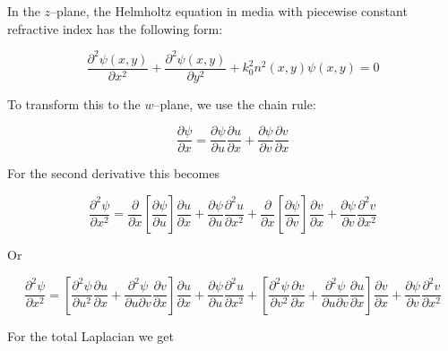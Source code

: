 \begin{sidebar}
In the $z$--plane, the Helmholtz equation in media with piecewise constant
refractive index has the following form:

\begin{equation}
\frac{\partial^2 \psi(x,y)}{\partial x^2} + \frac{\partial^2 \psi(x,y)}{\partial
y^2} + k_0^2 n^2(x,y) \psi(x,y) = 0
\end{equation} 

To transform this to the $w$--plane, we use the chain rule:

\begin{equation}
\frac{\partial \psi}{\partial x} = \frac{\partial \psi}{\partial u}
\frac{\partial u}{\partial x} + \frac{\partial \psi}{\partial v} \frac{\partial
v}{\partial x}
\end{equation} 

For the second derivative this becomes

\begin{equation}
\frac{\partial^2 \psi}{\partial x^2} = \frac{\partial}{\partial x} \left[
\frac{\partial \psi}{\partial u}\right]  \frac{\partial u}{\partial x} +
\frac{\partial \psi}{\partial u}\frac{\partial^2 u}{\partial x^2} +  
\frac{\partial}{\partial x} \left[ \frac{\partial \psi}{\partial v}\right] 
\frac{\partial v}{\partial x}  + \frac{\partial \psi}{\partial
v}\frac{\partial^2 v}{\partial x^2}
\end{equation} 

Or

\begin{equation}
\frac{\partial^2 \psi}{\partial x^2} = \left[ \frac{\partial^2 \psi}{\partial
u^2 } \frac{\partial u}{\partial x} +  \frac{\partial^2 \psi}{\partial u
\partial v} \frac{\partial v}{\partial x} \right] \frac{\partial u}{\partial x}
 + \frac{\partial \psi}{\partial u}\frac{\partial^2 u}{\partial x^2} 
+ \left[ \frac{\partial^2 \psi}{\partial v^2 } \frac{\partial v}{\partial x} + 
\frac{\partial^2 \psi}{\partial u \partial v} \frac{\partial u}{\partial x}
\right] \frac{\partial v}{\partial x}  
+ \frac{\partial \psi}{\partial v}\frac{\partial^2 v}{\partial x^2}
\end{equation} 

For the total Laplacian we get


\end{sidebar}
